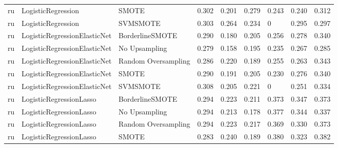 \begin{tabular}{lllllllll}
      ru &              LogisticRegression &                         SMOTE & 0.302 &                     0.201 &                 0.279 &                  0.243 &                                   0.240 &     0.312 \\
      ru &              LogisticRegression &                      SVMSMOTE & 0.303 &                     0.264 &                 0.234 &                      0 &                                   0.295 &     0.297 \\
      ru &    LogisticRegressionElasticNet &               BorderlineSMOTE & 0.290 &                     0.180 &                 0.205 &                  0.256 &                                   0.278 &     0.340 \\
      ru &    LogisticRegressionElasticNet &                 No Upsampling & 0.279 &                     0.158 &                 0.195 &                  0.235 &                                   0.267 &     0.285 \\
      ru &    LogisticRegressionElasticNet &           Random Oversampling & 0.286 &                     0.220 &                 0.189 &                  0.255 &                                   0.263 &     0.343 \\
      ru &    LogisticRegressionElasticNet &                         SMOTE & 0.290 &                     0.191 &                 0.205 &                  0.230 &                                   0.276 &     0.340 \\
      ru &    LogisticRegressionElasticNet &                      SVMSMOTE & 0.308 &                     0.205 &                 0.221 &                      0 &                                   0.251 &     0.334 \\
      ru &         LogisticRegressionLasso &               BorderlineSMOTE & 0.294 &                     0.223 &                 0.211 &                  0.373 &                                   0.347 &     0.373 \\
      ru &         LogisticRegressionLasso &                 No Upsampling & 0.294 &                     0.213 &                 0.178 &                  0.377 &                                   0.344 &     0.337 \\
      ru &         LogisticRegressionLasso &           Random Oversampling & 0.294 &                     0.223 &                 0.217 &                  0.369 &                                   0.330 &     0.373 \\
      ru &         LogisticRegressionLasso &                         SMOTE & 0.283 &                     0.240 &                 0.189 &                  0.380 &                                   0.323 &     0.382 \\

\end{tabular}
